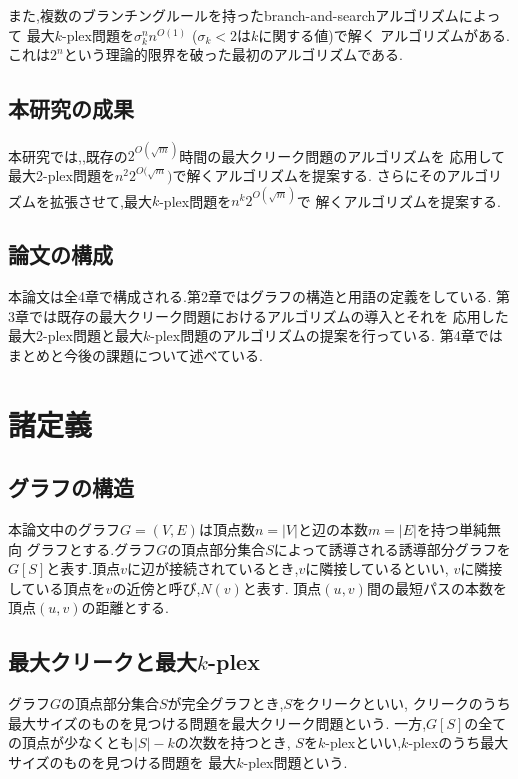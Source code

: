 \documentclass{thesis}
\theoremstyle{definition}
\begin{document}
また,複数のブランチングルールを持ったbranch-and-searchアルゴリズムによって
最大$k$-plex問題を$\sigma_{k}^{n}n^{O(1) }$ ($\sigma_{k} < 2$は$k$に関する値)で解く
アルゴリズムがある. \cite{xiao2017fast}  これは$2^{n}$という理論的限界を破った最初のアルゴリズムである.

\section{本研究の成果}
本研究では,,既存の$2^{O(\sqrt{m})}$時間の最大クリーク問題のアルゴリズムを
応用して最大2-plex問題を$n^{2}2^{O(\sqrt{m}})$で解くアルゴリズムを提案する.
さらにそのアルゴリズムを拡張させて,最大$k$-plex問題を$n^{k }2^{O(\sqrt{m})}$で
解くアルゴリズムを提案する.

\section{論文の構成}
本論文は全4章で構成される.第2章ではグラフの構造と用語の定義をしている.
第3章では既存の最大クリーク問題におけるアルゴリズムの導入とそれを
応用した最大2-plex問題と最大$k$-plex問題のアルゴリズムの提案を行っている.
第4章ではまとめと今後の課題について述べている.

\newpage

\chapter{諸定義}

\section{グラフの構造}
本論文中のグラフ$G=(V,E)$は頂点数$n=|V|$と辺の本数$m=|E|$を持つ単純無向
グラフとする.グラフ$G$の頂点部分集合$S$によって誘導される誘導部分グラフを
$G[S]$と表す.頂点$v$に辺が接続されているとき,$v$に隣接しているといい,
$v$に隣接している頂点を$v$の近傍と呼び,$N(v)$と表す.
頂点$(u,v)$間の最短パスの本数を頂点$(u,v)$の距離とする.

\section{最大クリークと最大$k$-plex}
グラフ$G$の頂点部分集合$S$が完全グラフとき,$S$をクリークといい,
クリークのうち最大サイズのものを見つける問題を最大クリーク問題という.
一方,$G[S]$の全ての頂点が少なくとも$|S| - k$の次数を持つとき,
$S$を$k$-plexといい,$k$-plexのうち最大サイズのものを見つける問題を
最大$k$-plex問題という.
\end{document}
